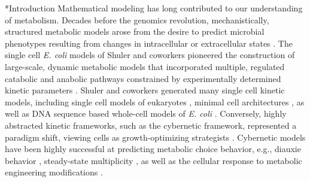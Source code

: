 \documentclass[12pt]{article}
\makeatletter
\renewcommand\section{\@startsection
	{subsection}{2}{0mm}
	{-0.2in}
	{0.05\baselineskip}
	{\normalfont\large\bfseries}}
\makeatother
\begin{document}
\section*{Introduction}
Mathematical modeling has long contributed to our understanding of metabolism. 
Decades before the genomics revolution, mechanistically, structured metabolic models arose from the desire to predict microbial phenotypes resulting from 
changes in intracellular or extracellular states \citep{1976_fredrickson_BiotechBioeng}. 
The single cell \textit{E. coli} models of Shuler and coworkers pioneered the construction of large-scale, dynamic metabolic models that incorporated multiple, regulated catabolic and anabolic 
pathways constrained by experimentally determined kinetic parameters \citep{1984_domach_shuler_BiotechBioeng_01}. 
Shuler and coworkers generated many single cell kinetic models, including single cell models of eukaryotes \citep{1989_steinmeyer_shuler_ChemEngSci,1992_wu_shuler_AnnNYAcadSci}, minimal cell architectures \citep{2004_castellanos_shuler_PNAS}, as well as DNA sequence based whole-cell models of \textit{E. coli} \citep{2008_atlas_shuler_IETSysBio}.
Conversely, highly abstracted kinetic frameworks, such as the cybernetic framework, represented a paradigm shift, viewing cells as growth-optimizing strategists \citep{1985_dhurjati_ramkrishna_tsao_BiotechBioeng}. 
Cybernetic models have been highly successful at predicting metabolic choice behavior, e.g., diauxie behavior \citep{1986_kompala_ramkrishna_tsao_BiotechBioeng}, 
steady-state multiplicity \citep{2012_kim_ramkrishna_BiotechProg}, as well as the cellular response to metabolic engineering modifications \citep{1999_varner_ramkrishna_MetaEng}. 
\end{document}

